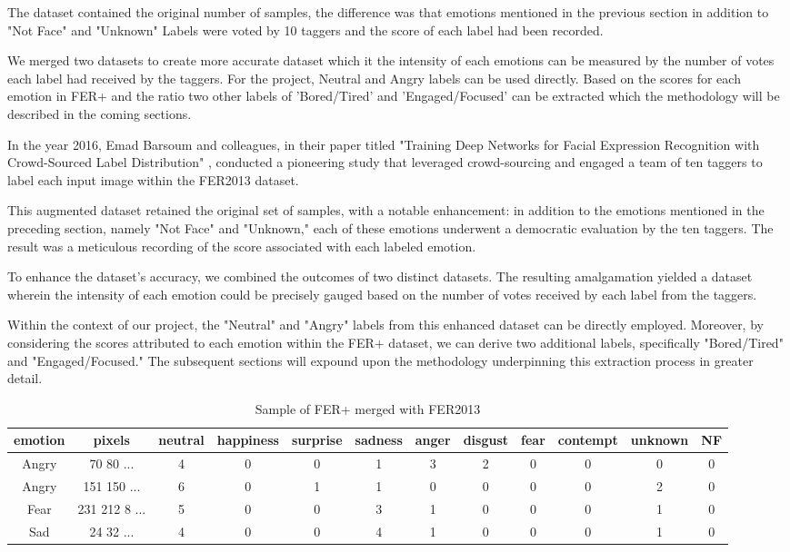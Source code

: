 \documentclass[]{report}
\begin{document}
The dataset contained the original number of samples, the difference was that emotions mentioned in the previous section in addition to "Not Face" and "Unknown" Labels were voted by 10 taggers and the score of each label had been recorded.

We merged two datasets to create more accurate dataset which it the intensity of each emotions can be measured by the number of votes each label had received by the taggers. For the project, Neutral and Angry labels can be used directly. Based on the scores for each emotion in FER+ and the ratio two other labels of 'Bored/Tired' and 'Engaged/Focused' can be extracted which the methodology will be described in the coming sections.


In the year 2016, Emad Barsoum and colleagues, in their paper titled "Training Deep Networks for Facial Expression Recognition with Crowd-Sourced Label Distribution" \cite{barsoum2016training}, conducted a pioneering study that leveraged crowd-sourcing and engaged a team of ten taggers to label each input image within the FER2013 dataset.

This augmented dataset retained the original set of samples, with a notable enhancement: in addition to the emotions mentioned in the preceding section, namely "Not Face" and "Unknown," each of these emotions underwent a democratic evaluation by the ten taggers. The result was a meticulous recording of the score associated with each labeled emotion.

To enhance the dataset's accuracy, we combined the outcomes of two distinct datasets. The resulting amalgamation yielded a dataset wherein the intensity of each emotion could be precisely gauged based on the number of votes received by each label from the taggers.

Within the context of our project, the "Neutral" and "Angry" labels from this enhanced dataset can be directly employed. Moreover, by considering the scores attributed to each emotion within the FER+ dataset, we can derive two additional labels, specifically "Bored/Tired" and "Engaged/Focused." The subsequent sections will expound upon the methodology underpinning this extraction process in greater detail.

\begin{table}
	\centering
	\caption{Sample of FER+ merged with FER2013}
	\begin{tabular}{|c|c|c|c|c|c|c|c|c|c|c|c|}
		\hline
emotion &	pixels &	neutral &	happiness &	surprise &	sadness &	anger &	disgust &	fear &	contempt &	unknown &	NF \\ \hline
Angry &	70 80  ... &	4 &	0 &	0 &	1 &	3 &	2 &	0 &	0 &	0 &	0 \\\hline
Angry &	151 150  ... &	6 &	0 &	1 &	1 &	0 &	0 &	0 &	0 &	2 &	0 \\ \hline
Fear &	231 212 8 ... &	5 &	0 &	0 &	3 &	1 &	0 &	0 &	0 &	1 &	0 \\ \hline
Sad &	24 32 ... &	4 &	0 &	0 &	4 &	1 &	0 &	0 &	0 &	1 &	0 \\ \hline
	\end{tabular}
\end{table}
\end{document}

